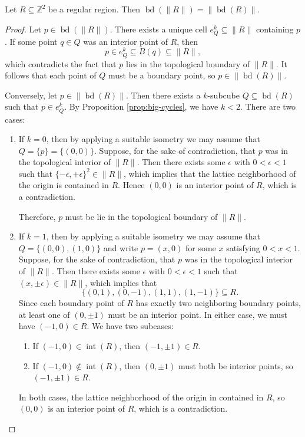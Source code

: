 \begin{proposition}\label{prop:real-boundary}
  Let $R \subseteq \mathbb{Z}^2$ be a regular region. Then $\operatorname{bd} (\lVert R \rVert) = \lVert \operatorname{bd}(R) \rVert$.
\end{proposition}
\begin{proof}
  Let $p \in \operatorname{bd} (\lVert R \rVert)$. There exists a unique cell $e^k_Q \subseteq \lVert R \rVert$ containing $p$. If some point $q \in Q$ was an interior point of $R$, then
  \begin{equation}
    p \in e^k_Q \subseteq  B(q) \subseteq \lVert R \rVert,
  \end{equation}
  which contradicts the fact that $p$ lies in the topological boundary of $\lVert R \rVert$. It follows that each point of $Q$ must be a boundary point, so $p \in \lVert \operatorname{bd} (R) \rVert$.

  Conversely, let $p \in \lVert \operatorname{bd} (R) \rVert$. Then there exists a $k$-subcube $Q \subseteq \operatorname{bd}(R)$ such that $p \in e^k_Q$.
  By Proposition \ref{prop:big-cycles}, we have $k < 2$.
  There are two cases:
  \begin{enumerate}
    \item If $k = 0$, then by applying a suitable isometry we may assume that $Q = \{p\} = \{(0,0)\}$.
    Suppose, for the sake of contradiction, that $p$ was in the topological interior of $\lVert R \rVert$.
    Then there exists some $\epsilon$ with $0 < \epsilon < 1$ such that $\{-\epsilon, +\epsilon\}^2 \in \lVert R \rVert$, which implies that the lattice neighborhood of the origin is contained in $R$. Hence $(0, 0)$ is an interior point of $R$, which is a contradiction.

    Therefore, $p$ must be lie in the topological boundary of $\lVert R \rVert$.

    \item If $k = 1$, then by applying a suitable isometry we may assume that $Q = \{(0, 0), (1, 0)\}$ and write $p = (x, 0)$ for some $x$ satisfying $0 < x < 1$. Suppose, for the sake of contradiction, that $p$ was in the topological interior of $\lVert R \rVert$. Then there exists some $\epsilon$ with $0 < \epsilon < 1$ such that $(x, \pm \epsilon) \in \lVert R \rVert$, which implies that
    \begin{equation}
      \{ (0, 1), (0, -1), (1, 1), (1, -1) \} \subseteq R.
    \end{equation}
    Since each boundary point of $R$ has exactly two neighboring boundary points, at least one of $(0, \pm 1)$ must be an interior point. In either case, we must have $(-1, 0) \in R$. We have two subcases:
    \begin{enumerate}
      \item If $(-1, 0) \in \operatorname{int}(R)$, then $(-1, \pm 1) \in R$. 
      \item If $(-1, 0) \not\in \operatorname{int}(R)$, then $(0, \pm 1)$ must both be interior points, so $(-1, \pm 1) \in R$.
    \end{enumerate}
    In both cases, the lattice neighborhood of the origin in contained in $R$, so $(0,0)$ is an interior point of $R$, which is a contradiction. 
    

\end{enumerate}
\end{proof}
